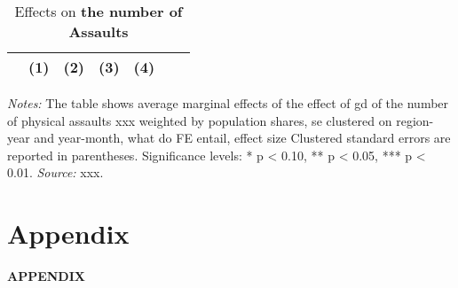 \documentclass[11pt, a4paper, draft]{article} %
\begin{document}
\begin{table}[H] \centering 
	\begin{threeparttable} \centering \caption{Effects on \textbf{the number of Assaults}}\label{tab_soc_ext:assaults_poisson_fixed_effects}
		{\def\sym#1{\ifmmode^{#1}\else\(^{#1}\)\fi} 
			\begin{tabular}{l*{6}{c}}
				\toprule 
				&\multicolumn{1}{c}{(1)}&\multicolumn{1}{c}{(2)}&\multicolumn{1}{c}{(3)}&\multicolumn{1}{c}{(4)}\\
				\midrule
				 
				\bottomrule 
		\end{tabular}}
		\begin{tablenotes} 
			\item \scriptsize \emph{Notes:} The table shows average marginal effects of the effect of gd of the number of physical assaults xxx 
			weighted by population shares, se clustered on region-year and year-month, what do FE entail, effect size
			Clustered standard errors are reported in parentheses. \newline Significance levels: * p < 0.10, ** p < 0.05, *** p < 0.01. \newline 	\emph{Source:} xxx.
		\end{tablenotes} 
	\end{threeparttable} 
\end{table}
\vspace*{\fill}\clearpage 




\newpage
\TODO\section{Appendix}
\vspace*{\fill}
{\Huge \begin{center}\textbf{APPENDIX}\end{center}}
\vspace*{\fill}\clearpage


\renewcommand\thefigure{A\arabic{figure}}
\setcounter{figure}{0} 
\captionsetup[subfigure]{labelformat=parens}
\end{document}
